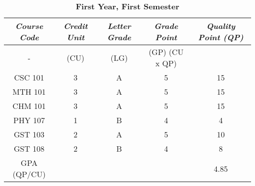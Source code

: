 \documentclass{article}
\begin{document}
	
	\begin{table}[h!]
		\begin{center}
			\caption\textbf{First Year, First Semester}
			\label{Table 1}
			\begin{tabular}{c|c|c|c|c|}
				\hline
				\textbf\textit{Course Code} & \textbf\textit{Credit Unit} & \textbf\textit{Letter Grade} & \textbf\textit{Grade Point} & \textbf\textit{Quality Point (QP)}\\
				\hline
				- & (CU) & (LG) & (GP) (CU x QP) \\
				\hline
				CSC 101 & 3 & A & 5 & 15\\
				\hline
				MTH 101 & 3 & A & 5 & 15\\
				\hline
				CHM 101 & 3 & A & 5 & 15\\
				\hline
				PHY 107 & 1 & B & 4 & 4\\
				\hline
				GST 103 & 2 & A & 5 & 10\\
				\hline
				GST 108 & 2 & B & 4 & 8\\
				\hline
				GPA (QP/CU) &  &  &  & 4.85\\
				\hline
				\end{tabular}
		\end{center}
	\end{table}
\end{document}
